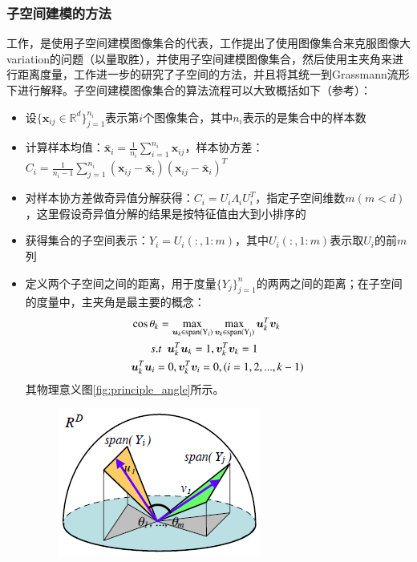 \subsubsection{子空间建模的方法}
\label{sec:current_SubMan_Subspace}
工作\cite{Subspace_MSM}，\cite{Subspace_GDA}是使用子空间建模图像集合的代表，工作\cite{Subspace_MSM}提出了使用图像集合来克服图像大variation的问题（以量取胜），并使用子空间建模图像集合，然后使用主夹角来进行距离度量，工作\cite{Subspace_GDA}进一步的研究了子空间的方法，并且将其统一到Grassmann流形下进行解释。子空间建模图像集合的算法流程可以大致概括如下（参考\cite{Subspace_GDA}）：
\begin{itemize}
\item 设$\{\bm{x}_{ij} \in \mathbb{R}^{d}\}_{j=1}^{n_i}$表示第$i$个图像集合，其中$n_i$表示的是集合中的样本数
\item 计算样本均值：$\bar{\bm{x}}_i=\frac{1}{n_i}\sum_{i=1}^{n_i} \bm{x}_{ij}$，样本协方差：$C_i=\frac{1}{n_i-1}\sum_{j=1}^{n_i}(\bm{x}_{ij}-\bar{\bm{x}}_i)(\bm{x}_{ij}-\bar{\bm{x}}_i)^{T}$
\item 对样本协方差做奇异值分解获得：$C_i=U_i\Lambda_iU_{i}^{T}$，指定子空间维数$m(m<d)$，这里假设奇异值分解的结果是按特征值由大到小排序的
\item 获得集合的子空间表示：$Y_i=U_i(:,1:m)$，其中$U_i(:,1:m)$表示取$U_i$的前$m$列
\item 定义两个子空间之间的距离，用于度量$\{Y_j\}_{j=1}^n$的两两之间的距离；在子空间的度量中，主夹角是最主要的概念：
\begin{equation}
\label{principal_angle}
\begin{split}
&\cos \theta_{k}=\max_{\bm{u}_k \in {\rm span(Y_i)}}\max_{\bm{v}_k \in {\rm span(Y_j)}} \bm{u}_{k}^{T}\bm{v}_{k}\\
&~~~~~~~s.t~~\bm{u}_{k}^{T}\bm{u}_{k}=1,\bm{v}_{k}^{T}\bm{v}_{k}=1\\
&\bm{u}_{k}^{T}\bm{u}_{i}=0,\bm{v}_{k}^{T}\bm{v}_{i}=0,(i=1,2,...,k-1)\\
\end{split}
\end{equation}
其物理意义图\ref{fig:principle_angle}所示。
\begin{figure}[h]
	\centering
	\includegraphics[width=0.4\linewidth]{source/principal_angle.png}

\end{figure}
\end{itemize}
